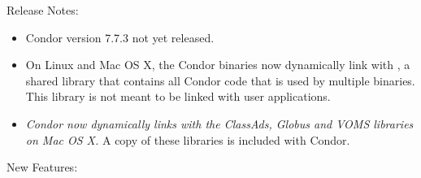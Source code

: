 \noindent Release Notes:

\begin{itemize}

\item Condor version 7.7.3 not yet released.

\item On Linux and Mac OS X, the Condor binaries now dynamically link with
, 
a shared library that contains all Condor code that is
used by multiple binaries. 
This library is not meant to be linked with user applications.

\item \emph{Condor now dynamically links with the ClassAds, Globus and VOMS
libraries on Mac OS X.}
A copy of these libraries is included with Condor.

\end{itemize}


\noindent New Features:

